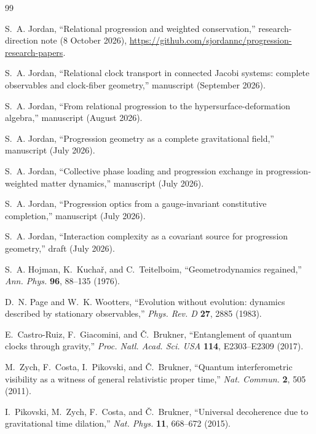 \documentclass[11pt]{article}
\theoremstyle{plain}
\theoremstyle{definition}
\theoremstyle{remark}
\begin{document}
\begin{thebibliography}{99}

S.~A. Jordan, ``Relational progression and weighted conservation,'' research-direction note (8 October 2026), \url{https://github.com/sjordannc/progression-research-papers}.

S.~A. Jordan, ``Relational clock transport in connected Jacobi systems: complete observables and clock-fiber geometry,'' manuscript (September 2026).

S.~A. Jordan, ``From relational progression to the hypersurface-deformation algebra,'' manuscript (August 2026).

S.~A. Jordan, ``Progression geometry as a complete gravitational field,'' manuscript (July 2026).

S.~A. Jordan, ``Collective phase loading and progression exchange in progression-weighted matter dynamics,'' manuscript (July 2026).

S.~A. Jordan, ``Progression optics from a gauge-invariant constitutive completion,'' manuscript (July 2026).

S.~A. Jordan, ``Interaction complexity as a covariant source for progression geometry,'' draft (July 2026).

S.~A. Hojman, K.~Kucha\v{r}, and C.~Teitelboim, ``Geometrodynamics regained,'' \emph{Ann. Phys.} \textbf{96}, 88--135 (1976).

D.~N. Page and W.~K. Wootters, ``Evolution without evolution: dynamics described by stationary observables,'' \emph{Phys. Rev. D} \textbf{27}, 2885 (1983).

E.~Castro-Ruiz, F.~Giacomini, and \v{C}.~Brukner, ``Entanglement of quantum clocks through gravity,'' \emph{Proc. Natl. Acad. Sci. USA} \textbf{114}, E2303--E2309 (2017).

M.~Zych, F.~Costa, I.~Pikovski, and \v{C}.~Brukner, ``Quantum interferometric visibility as a witness of general relativistic proper time,'' \emph{Nat. Commun.} \textbf{2}, 505 (2011).

I.~Pikovski, M.~Zych, F.~Costa, and \v{C}.~Brukner, ``Universal decoherence due to gravitational time dilation,'' \emph{Nat. Phys.} \textbf{11}, 668--672 (2015).


\end{thebibliography}
\end{document}
